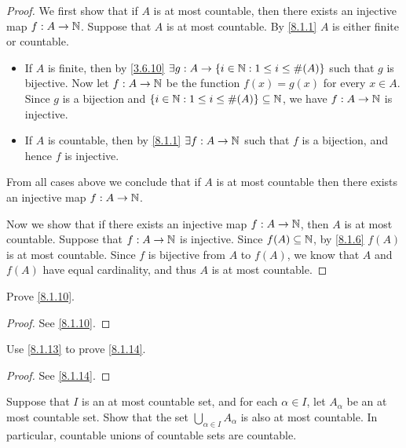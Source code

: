 \begin{proof}
  We first show that if \(A\) is at most countable, then there exists an injective map \(f : A \to \mathbb{N}\).
  Suppose that \(A\) is at most countable.
  By \cref{8.1.1} \(A\) is either finite or countable.
  \begin{itemize}
    \item If \(A\) is finite, then by \cref{3.6.10} \(\exists g : A \to \left\lbrace i \in \mathbb{N} : 1 \leq i \leq \#(A)\right\rbrace\) such that \(g\) is bijective.
          Now let \(f : A \to \mathbb{N}\) be the function \(f(x) = g(x)\) for every \(x \in A\).
          Since \(g\) is a bijection and \(\left\lbrace i \in \mathbb{N} : 1 \leq i \leq \#(A)\right\rbrace \subseteq \mathbb{N}\), we have \(f : A \to \mathbb{N}\) is injective.
    \item If \(A\) is countable, then by \cref{8.1.1} \(\exists f : A \to \mathbb{N}\) such that \(f\) is a bijection, and hence \(f\) is injective.
  \end{itemize}
  From all cases above we conclude that if \(A\) is at most countable then there exists an injective map \(f : A \to \mathbb{N}\).

  Now we show that if there exists an injective map \(f : A \to \mathbb{N}\), then \(A\) is at most countable.
  Suppose that \(f : A \to \mathbb{N}\) is injective.
  Since \(f(A) \subseteq \mathbb{N}\), by \cref{8.1.6} \(f(A)\) is at most countable.
  Since \(f\) is bijective from \(A\) to \(f(A)\), we know that \(A\) and \(f(A)\) have equal cardinality, and thus \(A\) is at most countable.
\end{proof}

\begin{ex}\label{ex:8.1.7}
  Prove \cref{8.1.10}.
\end{ex}

\begin{proof}
  See \cref{8.1.10}.
\end{proof}

\begin{ex}\label{ex:8.1.8}
  Use \cref{8.1.13} to prove \cref{8.1.14}.
\end{ex}

\begin{proof}
  See \cref{8.1.14}.
\end{proof}

\begin{ex}\label{ex:8.1.9}
  Suppose that \(I\) is an at most countable set, and for each \(\alpha \in I\), let \(A_{\alpha}\) be an at most countable set.
  Show that the set \(\bigcup_{\alpha \in I} A_{\alpha}\) is also at most countable.
  In particular, countable unions of countable sets are countable.
\end{ex}

